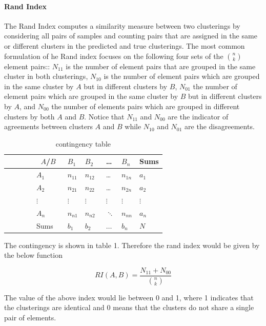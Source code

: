 \documentclass{book}
\begin{document}
\paragraph{Rand Index}%
The Rand Index computes a similarity measure between two clusterings by considering all pairs of samples and counting pairs that are assigned in the same or different clusters in the predicted and true clusterings. The most common formulation of he Rand index focuses on the following four sets of the $\binom nk$ element pairs:: $N_{11}$ is the number of element pairs that are grouped in the same cluster in both clusterings, $N_{10}$ is the number of element pairs which are grouped in the same cluster by $A$ but in different clusters by $B$, $N_{01}$ the number of element pairs which are grouped in the same cluster by $B$ but in different clusters by $A$, and $N_{00}$ the number of elements pairs which are grouped in different clusters by both $A$ and $B$. Notice that $N_{11}$ and $N_{00}$ are the indicator of agreements between clusters $A$ and $B$ while $N_{10}$ and $N_{01}$ are the disagreements.

\begin{table}[htpb]
	\centering
	\caption{contingency table}
	\label{tab:label}
	\begin{tabular}{|l|l|l|l|l|l|}
            $A$/$B$ & $B_1$    & $B_2$    & \dots  & $B_n$    & Sums  \\ \hline
            $A_1$   & $n_{11}$ & $n_{12}$ & \dots  & $n_{1n}$ & $a_1$ \\
            $A_2$   & $n_{21}$ & $n_{22}$ & \dots  & $n_{2n}$ & $a_2$ \\
            $\vdots$  & $\vdots$   & $\vdots$   & $\vdots$ & $\vdots$   & $\vdots$ \\
            $A_n$   & $n_{n1}$ & $n_{n2}$ & $\ddots$ & $n_{nn}$ & $a_n$ \\ \hline
            Sums    & $b_1$    & $b_2$    & $\dots$  & $b_n$    & $N$
	\end{tabular}
\end{table}

The contingency is shown in table 1. Therefore the rand index would be given by the below function

\begin{equation}
	RI(A, B) = \frac{N_{11} + N_{00}}{\binom nk}
\end{equation}

The value of the above index would lie between 0 and 1, where 1 indicates that the clusterings are identical and 0 means that the clusters do not share a single pair of elements.
\end{document}
